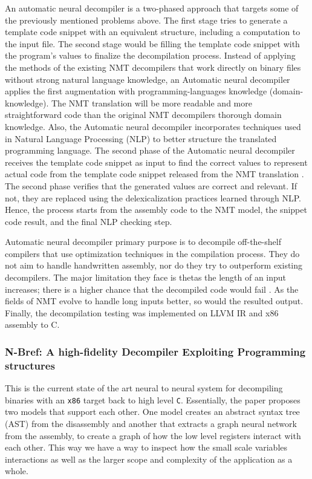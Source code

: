 \documentclass[conference,a4paper]{IEEEtran}
\begin{document}
An automatic neural decompiler is a two-phased approach that targets some of the previously mentioned problems above. The first stage tries to generate a template code snippet with an equivalent structure, including a computation to the input file. The second stage would be filling the template code snippet with the program's values to finalize the decompilation process.
Instead of applying the methods of the existing NMT decompilers that work directly on binary files without strong natural language knowledge, an Automatic neural decompiler applies the first augmentation with programming-languages knowledge (domain-knowledge). The NMT translation will be more readable and more straightforward code than the original NMT decompilers thorough domain knowledge.
Also, the Automatic neural decompiler incorporates techniques used in Natural Language Processing (NLP) to better structure the translated programming language. The second phase of the Automatic neural decompiler receives the template code snippet as input to find the correct values to
represent actual code from the template code snippet released from the NMT translation \cite{katz_towards_2019}. The second phase verifies that the generated values are correct and relevant. If not, they are replaced using the delexicalization practices learned through NLP. Hence, the process starts from the assembly code to the NMT model, the snippet code result, and the final NLP checking step.

Automatic neural decompiler primary purpose is to decompile off-the-shelf compilers that use optimization techniques in the compilation process. They do not aim to handle handwritten assembly, nor do they try to outperform existing decompilers. The major limitation they face is thetas the length of an input
increases; there is a higher chance that the decompiled code would fail \cite{katz_towards_2019}. As the fields of NMT evolve to handle long inputs better, so would the resulted output. Finally, the decompilation testing was implemented on LLVM IR
and x86 assembly to C.


\subsubsection{N-Bref: A high-fidelity Decompiler Exploiting Programming structures}

This is the current state of the art neural to neural system for decompiling binaries with an \verb|x86| target back to high level \verb|C|\cite{fu_n-bref_2020}.
Essentially, the paper proposes two models that support each other.
One model creates an abstract syntax tree (AST) from the disassembly and another that extracts a graph neural network from the assembly, to create a graph of how the low level registers interact with each other.
This way we have a way to inspect how the small scale variables interactions as well as the larger scope and complexity of the application as a whole.
\end{document}
